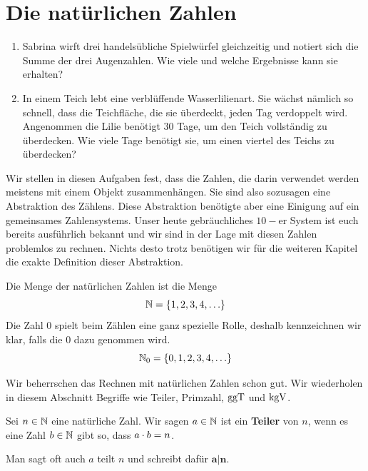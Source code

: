 \documentclass[11pt,oneside]{article}
\begin{document}
\newpage
\section{Die natürlichen Zahlen}
    \begin{aufgabe}
        \begin{enumerate}
            \item Sabrina wirft drei handelsübliche Spielwürfel gleichzeitig und notiert sich die Summe der drei Augenzahlen. Wie viele und welche Ergebnisse kann sie erhalten?
        \end{enumerate}
        \begin{enumerate}\setcounter{enumi}{1}
            \item In einem Teich lebt eine verblüffende Wasserlilienart. Sie wächst nämlich so schnell, dass die Teichfläche, die sie überdeckt, jeden Tag verdoppelt wird. Angenommen die Lilie benötigt $30$ Tage, um den Teich vollständig zu überdecken. Wie viele Tage benötigt sie, um einen viertel des Teichs zu überdecken?
        \end{enumerate}
    \end{aufgabe}
    Wir stellen in diesen Aufgaben fest, dass die Zahlen, die darin verwendet werden meistens mit einem Objekt zusammenhängen. Sie sind also sozusagen eine Abstraktion des Zählens. Diese Abstraktion benötigte aber eine Einigung auf ein gemeinsames Zahlensystems. Unser heute gebräuchliches $10-$er System ist euch bereits ausführlich bekannt und wir sind in der Lage mit diesen Zahlen problemlos zu rechnen. Nichts desto trotz benötigen wir für die weiteren Kapitel die exakte Definition dieser Abstraktion.
    \begin{definition}
        Die Menge der natürlichen Zahlen ist die Menge \[\mathbb{N}=\{1,2,3,4,\ldots\}\]
        Die Zahl $0$ spielt beim Zählen eine ganz spezielle Rolle, deshalb kennzeichnen wir klar, falls die $0$ dazu genommen wird. \[\mathbb{N}_0=\{0,1,2,3,4,\ldots\}\]
    \end{definition}
    Wir beherrschen das Rechnen mit natürlichen Zahlen schon gut. Wir wiederholen in diesem Abschnitt Begriffe wie Teiler, Primzahl, $\operatorname{ggT}$ und $\operatorname{kgV}$.
    \begin{definition}
	   Sei $n\in\mathbb{N}$ eine natürliche Zahl. Wir sagen $a\in\mathbb{N}$ ist ein \textbf{Teiler} von $n$, wenn es eine Zahl $b\in\mathbb{N}$ gibt so, dass $a\cdot b=n$.
    \end{definition}
    \begin{notation}
        Man sagt oft auch \glqq$a$ teilt $n$\grqq\: und schreibt dafür $\mathbf{a|n}$.
    \end{notation}
\end{document}
